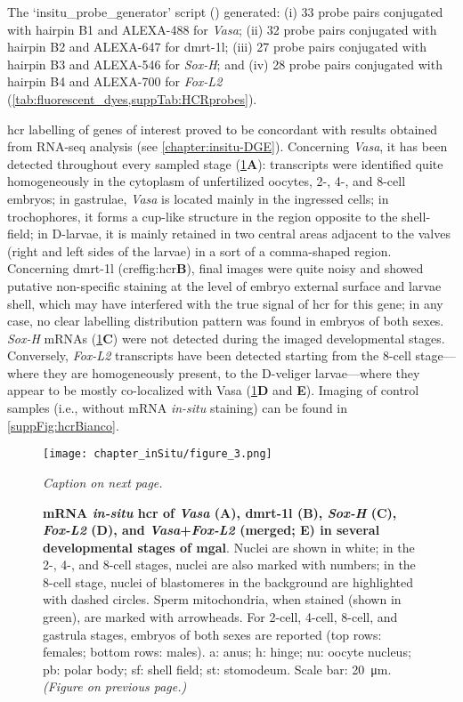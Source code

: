 The ‘insitu\_probe\_generator’ script () generated: (i) 33 probe pairs conjugated with hairpin B1 and ALEXA-488 for \textit{Vasa}; (ii) 32 probe pairs conjugated with hairpin B2 and ALEXA-647 for \gls{dmrt-1l}; (iii) 27 probe pairs conjugated with hairpin B3 and ALEXA-546 for \textit{Sox-H}; and (iv) 28 probe pairs conjugated with hairpin B4 and ALEXA-700 for \textit{Fox-L2} (\cref{tab:fluorescent_dyes,suppTab:HCRprobes}).

\gls{hcr} labelling of genes of interest proved to be concordant with results obtained from RNA-seq analysis (see \cref{chapter:insitu-DGE}). Concerning \textit{Vasa}, it has been detected throughout every sampled stage (\cref{fig:hcr}\textbf{A}): transcripts were identified quite homogeneously in the cytoplasm of unfertilized oocytes, 2-, 4-, and 8-cell embryos; in gastrulae, \textit{Vasa} is located mainly in the ingressed cells; in trochophores, it forms a cup-like structure in the region opposite to the shell-field; in D-larvae, it is mainly retained in two central areas adjacent to the valves (right and left sides of the larvae) in a sort of a comma-shaped region. Concerning \gls{dmrt-1l} (cref{fig:hcr}\textbf{B}), final images were quite noisy and showed putative non-specific staining at the level of embryo external surface and larvae shell, which may have interfered with the true signal of \gls{hcr} for this gene; in any case, no clear labelling distribution pattern was found in embryos of both sexes. \textit{Sox-H} mRNAs (\cref{fig:hcr}\textbf{C}) were not detected during the imaged developmental stages. Conversely, \textit{Fox-L2} transcripts have been detected starting from the 8-cell stage—where they are homogeneously present, to the D-veliger larvae—where they appear to be mostly co-localized with Vasa (\cref{fig:hcr}\textbf{D} and \textbf{E}). Imaging of control samples (i.e., without mRNA \textit{in-situ} staining) can be found in \cref{suppFig:hcrBianco}.

\begin{figure}
    \centering
    \texttt{[image: chapter\_inSitu/figure\_3.png]}
    \caption{\textit{Caption on next page.}}
    \label{fig:hcr}
\end{figure}

\begingroup
\captionsetup[figure]{format=hruleformat}
\begin{figure}\ContinuedFloat
    \caption[]
	{
		\textbf{mRNA \textit{in-situ} \gls{hcr} of \textit{Vasa} (A), \gls{dmrt-1l} (B), \textit{Sox-H} (C), \textit{Fox-L2} (D), and \textit{Vasa}+\textit{Fox-L2} (merged; E) in several developmental stages of \gls{mgal}}. Nuclei are shown in white; in the 2-, 4-, and 8-cell stages, nuclei are also marked with numbers; in the 8-cell stage, nuclei of blastomeres in the background are highlighted with dashed circles. Sperm mitochondria, when stained (shown in green), are marked with arrowheads. For 2-cell, 4-cell, 8-cell, and gastrula stages, embryos of both sexes are reported (top rows: females; bottom rows: males). a: anus; h: hinge; nu: oocyte nucleus; pb: polar body; sf: shell field; st: stomodeum. Scale bar: \qty{20}{\um}. \textit{(Figure on previous page.)}
	}
\end{figure}
\endgroup

